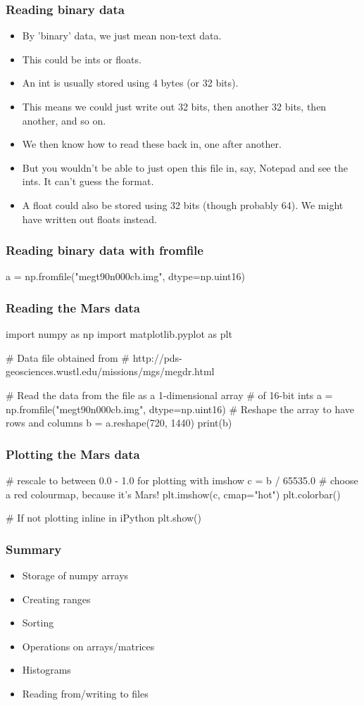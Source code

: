 \documentclass{beamer}
\begin{document}
\begin{frame}[fragile]
\frametitle{Reading binary data}
\begin{itemize}
\item By 'binary' data, we just mean non-text data. 
\item This could be ints or floats.
\item An int is usually stored using 4 bytes (or 32 bits).
\item This means we could just write out 32 bits, then another 32
  bits, then another, and so on.
\item We then know how to read these back in, one after another.
\item But you wouldn't be able to just open this file in, say, Notepad and see
  the ints. It can't guess the format.
\item A float could also be stored using 32 bits (though probably
  64). We might have written out floats instead.
\end{itemize}
\end{frame}

\begin{frame}[fragile]
\frametitle{Reading binary data with fromfile}
\begin{code}
a = np.fromfile("megt90n000cb.img", dtype=np.uint16)
\end{code}
\end{frame}

\begin{frame}[fragile]
\frametitle{Reading the Mars data}
\begin{code}
import numpy as np
import matplotlib.pyplot as plt

# Data file obtained from 
# http://pds-geosciences.wustl.edu/missions/mgs/megdr.html

# Read the data from the file as a 1-dimensional array 
# of 16-bit ints
a = np.fromfile("megt90n000cb.img", dtype=np.uint16)
# Reshape the array to have rows and columns
b = a.reshape(720, 1440)
print(b)
\end{code}
\end{frame}


\begin{frame}[fragile]
\frametitle{Plotting the Mars data}
\begin{code}
# rescale to between 0.0 - 1.0 for plotting with imshow
c = b / 65535.0
# choose a red colourmap, because it's Mars!
plt.imshow(c, cmap="hot")
plt.colorbar()

# If not plotting inline in iPython
plt.show()
\end{code}
\end{frame}

\begin{frame}[fragile]
\frametitle{Summary}
\begin{itemize}
\item Storage of numpy arrays
\item Creating ranges
\item Sorting
\item Operations on arrays/matrices
\item Histograms
\item Reading from/writing to files
\end{itemize}
\end{frame}
\end{document}
